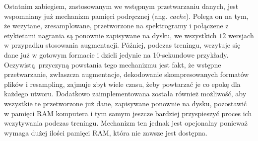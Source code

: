 Ostatnim zabiegiem, zastosowanym we wstępnym przetwarzaniu danych, jest wspomniany już mechanizm pamięci podręcznej (ang. \emph{cache}). Polega on na tym, że wczytane, zresamplowane, przetworzone na spektrogramy i połączene z etykietami nagrania są ponownie zapisywane na dysku, we wszystkich $12$ wersjach w przypadku stosowania augmentacji. Później, podczas treningu, wczytuje się dane już w gotowym formacie i dzieli jedynie na 10-sekundowe przykłady. Oczywistą przyczyną powstania tego mechanizmu jest fakt, że wstępne przetwarzanie, zwłaszcza augmentacje, dekodowanie skompresowanych formatów plików i resampling, zajmuje zbyt wiele czasu, żeby powtarzać je co epokę dla każdego utworu. Dodatkowo zaimplementowana została również możliwość, aby wszystkie te przetworzone już dane, zapisywane ponownie na dysku, pozostawić w pamięci RAM komputera i tym samym jeszcze bardziej przyspieszyć proces ich wczytywania podczas treningu. Mechanizm ten jednak jest opcjonalny ponieważ wymaga dużej ilości pamięci RAM, która nie zawsze jest dostępna.
